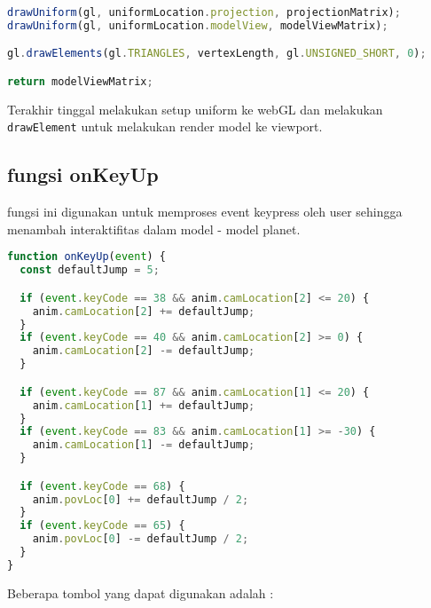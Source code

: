 \begin{lstlisting}[language=javascript, label={lst: drawUniform}, caption={draw}]
drawUniform(gl, uniformLocation.projection, projectionMatrix);
drawUniform(gl, uniformLocation.modelView, modelViewMatrix);

gl.drawElements(gl.TRIANGLES, vertexLength, gl.UNSIGNED_SHORT, 0);

return modelViewMatrix;
\end{lstlisting}

Terakhir tinggal melakukan setup uniform ke webGL dan melakukan \texttt{drawElement} untuk melakukan render model ke viewport.

\subsection*{fungsi onKeyUp}

fungsi ini digunakan untuk memproses event keypress oleh user sehingga menambah interaktifitas dalam model - model planet.

\begin{lstlisting}[language=javascript, label={lst: onKeyUp}, caption={fungsi onKeyUp}]
function onKeyUp(event) {
  const defaultJump = 5;

  if (event.keyCode == 38 && anim.camLocation[2] <= 20) {
    anim.camLocation[2] += defaultJump;
  }
  if (event.keyCode == 40 && anim.camLocation[2] >= 0) {
    anim.camLocation[2] -= defaultJump;
  }

  if (event.keyCode == 87 && anim.camLocation[1] <= 20) {
    anim.camLocation[1] += defaultJump;
  }
  if (event.keyCode == 83 && anim.camLocation[1] >= -30) {
    anim.camLocation[1] -= defaultJump;
  }

  if (event.keyCode == 68) {
    anim.povLoc[0] += defaultJump / 2;
  }
  if (event.keyCode == 65) {
    anim.povLoc[0] -= defaultJump / 2;
  }
}

\end{lstlisting}

Beberapa tombol yang dapat digunakan adalah :

